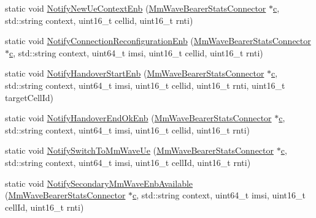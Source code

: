 \begin{DoxyCompactItemize}
\item 
static void \hyperlink{classns3_1_1MmWaveBearerStatsConnector_a979bbe93fcd70dbd23476e5ad2a98b81}{Notify\+New\+Ue\+Context\+Enb} (\hyperlink{classns3_1_1MmWaveBearerStatsConnector}{Mm\+Wave\+Bearer\+Stats\+Connector} $\ast$\hyperlink{mmwave_2model_2fading-traces_2fading__trace__generator_8m_ae0323a9039add2978bf5b49550572c7c}{c}, std\+::string context, uint16\+\_\+t cellid, uint16\+\_\+t rnti)
\item 
static void \hyperlink{classns3_1_1MmWaveBearerStatsConnector_a49dcac6336320ee6ddb5da902c4b4dec}{Notify\+Connection\+Reconfiguration\+Enb} (\hyperlink{classns3_1_1MmWaveBearerStatsConnector}{Mm\+Wave\+Bearer\+Stats\+Connector} $\ast$\hyperlink{mmwave_2model_2fading-traces_2fading__trace__generator_8m_ae0323a9039add2978bf5b49550572c7c}{c}, std\+::string context, uint64\+\_\+t imsi, uint16\+\_\+t cellid, uint16\+\_\+t rnti)
\item 
static void \hyperlink{classns3_1_1MmWaveBearerStatsConnector_a46ff74e05696af0f69e1ea0458f71dcc}{Notify\+Handover\+Start\+Enb} (\hyperlink{classns3_1_1MmWaveBearerStatsConnector}{Mm\+Wave\+Bearer\+Stats\+Connector} $\ast$\hyperlink{mmwave_2model_2fading-traces_2fading__trace__generator_8m_ae0323a9039add2978bf5b49550572c7c}{c}, std\+::string context, uint64\+\_\+t imsi, uint16\+\_\+t cellid, uint16\+\_\+t rnti, uint16\+\_\+t target\+Cell\+Id)
\item 
static void \hyperlink{classns3_1_1MmWaveBearerStatsConnector_aad2a464af800763ebf5fd37fe2241c28}{Notify\+Handover\+End\+Ok\+Enb} (\hyperlink{classns3_1_1MmWaveBearerStatsConnector}{Mm\+Wave\+Bearer\+Stats\+Connector} $\ast$\hyperlink{mmwave_2model_2fading-traces_2fading__trace__generator_8m_ae0323a9039add2978bf5b49550572c7c}{c}, std\+::string context, uint64\+\_\+t imsi, uint16\+\_\+t cellid, uint16\+\_\+t rnti)
\item 
static void \hyperlink{classns3_1_1MmWaveBearerStatsConnector_a4c346344bd63df7fbec533e3ca654001}{Notify\+Switch\+To\+Mm\+Wave\+Ue} (\hyperlink{classns3_1_1MmWaveBearerStatsConnector}{Mm\+Wave\+Bearer\+Stats\+Connector} $\ast$\hyperlink{mmwave_2model_2fading-traces_2fading__trace__generator_8m_ae0323a9039add2978bf5b49550572c7c}{c}, std\+::string context, uint64\+\_\+t imsi, uint16\+\_\+t cell\+Id, uint16\+\_\+t rnti)
\item 
static void \hyperlink{classns3_1_1MmWaveBearerStatsConnector_aa1b18db31a6f4815544b154f97ff79a5}{Notify\+Secondary\+Mm\+Wave\+Enb\+Available} (\hyperlink{classns3_1_1MmWaveBearerStatsConnector}{Mm\+Wave\+Bearer\+Stats\+Connector} $\ast$\hyperlink{mmwave_2model_2fading-traces_2fading__trace__generator_8m_ae0323a9039add2978bf5b49550572c7c}{c}, std\+::string context, uint64\+\_\+t imsi, uint16\+\_\+t cell\+Id, uint16\+\_\+t rnti)

\end{DoxyCompactItemize}
